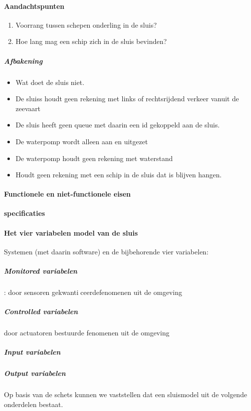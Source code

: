 \paragraph{Aandachtspunten}
\begin{enumerate}
\item Voorrang tussen schepen onderling in de sluis?
\item Hoe lang mag een schip zich in de sluis bevinden?
\end{enumerate} 




\subparagraph{Afbakening}
\begin{itemize}
\item Wat doet de sluis niet.
\item De sluiss houdt geen rekening met links of rechtsrijdend verkeer vanuit de zeevaart
\item De sluis heeft geen queue met daarin een id gekoppeld aan de sluis.
\item De waterpomp wordt alleen aan en uitgezet
\item De waterpomp houdt geen rekening met waterstand
\item Houdt geen rekening met een schip in de sluis dat is blijven hangen.

\end{itemize}

\paragraph{Functionele en niet-functionele eisen}

\paragraph{specificaties}

\paragraph{Het vier variabelen model van de sluis}
Systemen (met daarin software) en de bijbehorende vier variabelen:
\subparagraph{Monitored variabelen}
: door sensoren gekwanticeerdefenomenen uit de omgeving
\subparagraph{Controlled variabelen}
door actuatoren bestuurde fenomenen uit de omgeving
\subparagraph{Input variabelen}
\subparagraph{Output variabelen}







Op basis van de schets kunnen we vaststellen dat een sluismodel uit de volgende onderdelen bestaat.

